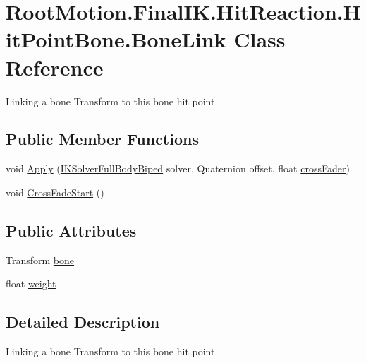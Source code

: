 \hypertarget{class_root_motion_1_1_final_i_k_1_1_hit_reaction_1_1_hit_point_bone_1_1_bone_link}{}\section{Root\+Motion.\+Final\+I\+K.\+Hit\+Reaction.\+Hit\+Point\+Bone.\+Bone\+Link Class Reference}
\label{class_root_motion_1_1_final_i_k_1_1_hit_reaction_1_1_hit_point_bone_1_1_bone_link}


Linking a bone Transform to this bone hit point  


\subsection*{Public Member Functions}
\begin{DoxyCompactItemize}
\item 
void \mbox{\hyperlink{class_root_motion_1_1_final_i_k_1_1_hit_reaction_1_1_hit_point_bone_1_1_bone_link_a67a4ab44d8b872aaffbb1dd84aaf71ba}{Apply}} (\mbox{\hyperlink{class_root_motion_1_1_final_i_k_1_1_i_k_solver_full_body_biped}{I\+K\+Solver\+Full\+Body\+Biped}} solver, Quaternion offset, float \mbox{\hyperlink{class_root_motion_1_1_final_i_k_1_1_hit_reaction_1_1_hit_point_a8cadd9b801baa420624e09bb44664648}{cross\+Fader}})
\item 
void \mbox{\hyperlink{class_root_motion_1_1_final_i_k_1_1_hit_reaction_1_1_hit_point_bone_1_1_bone_link_ad4d87dd7a9d12259b9896051e677ab4a}{Cross\+Fade\+Start}} ()
\end{DoxyCompactItemize}
\subsection*{Public Attributes}
\begin{DoxyCompactItemize}
\item 
Transform \mbox{\hyperlink{class_root_motion_1_1_final_i_k_1_1_hit_reaction_1_1_hit_point_bone_1_1_bone_link_a829e01beff51e2b6767f91d6307e8fbf}{bone}}
\item 
float \mbox{\hyperlink{class_root_motion_1_1_final_i_k_1_1_hit_reaction_1_1_hit_point_bone_1_1_bone_link_a66cae07954e7c3fbef1ca1390c297ebf}{weight}}
\end{DoxyCompactItemize}


\subsection{Detailed Description}
Linking a bone Transform to this bone hit point 



